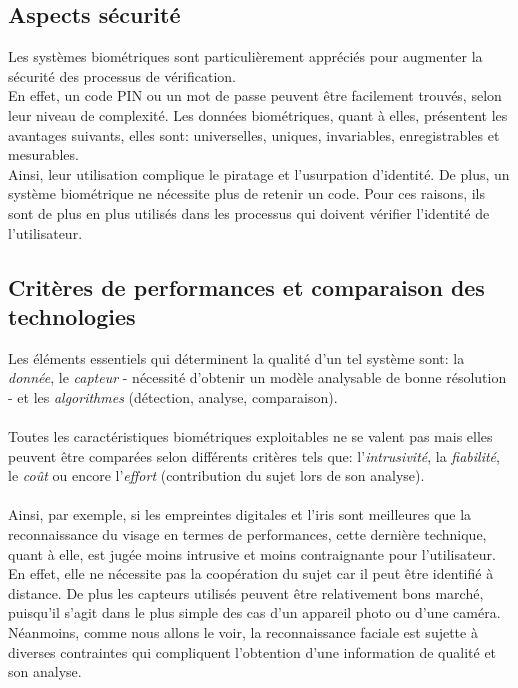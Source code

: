 \subsection{Aspects sécurité}
Les systèmes biométriques sont particulièrement appréciés pour augmenter la sécurité des processus de vérification.
\\En effet, un code PIN ou un mot de passe peuvent être facilement trouvés, selon leur niveau de complexité. Les données biométriques, quant à elles, présentent les avantages suivants, elles sont: universelles, uniques, invariables, enregistrables et mesurables.
\\Ainsi, leur utilisation complique le piratage et l'usurpation d'identité. De plus, un système biométrique ne nécessite plus de retenir un code. Pour ces raisons, ils sont de plus en plus utilisés dans les processus qui doivent vérifier l'identité de l'utilisateur.

\subsection{Critères de performances et comparaison des technologies}
Les éléments essentiels qui déterminent la qualité d'un tel système sont: la \textit{donnée}, le \textit{capteur} - nécessité d'obtenir un modèle analysable de bonne résolution - et les \textit{algorithmes} (détection, analyse, comparaison).
\paragraph{}
Toutes les caractéristiques biométriques exploitables ne se valent pas mais elles peuvent être comparées selon différents critères tels que: l'\textit{intrusivité}, la \textit{fiabilité}, le \textit{coût} ou encore l'\textit{effort} (contribution du sujet lors de son analyse).
\paragraph{}
Ainsi, par exemple, si les empreintes digitales et l'iris sont meilleures que la reconnaissance du visage en termes de performances, cette dernière technique, quant à elle, est jugée moins intrusive et moins contraignante pour l'utilisateur. En effet, elle ne nécessite pas la coopération du sujet car il peut être identifié à distance. De plus les capteurs utilisés peuvent être relativement bons marché, puisqu'il s'agit dans le plus simple des cas d'un appareil photo ou d'une caméra.
\\Néanmoins, comme nous allons le voir, la reconnaissance faciale est sujette à diverses contraintes qui compliquent l'obtention d'une information de qualité et son analyse.

